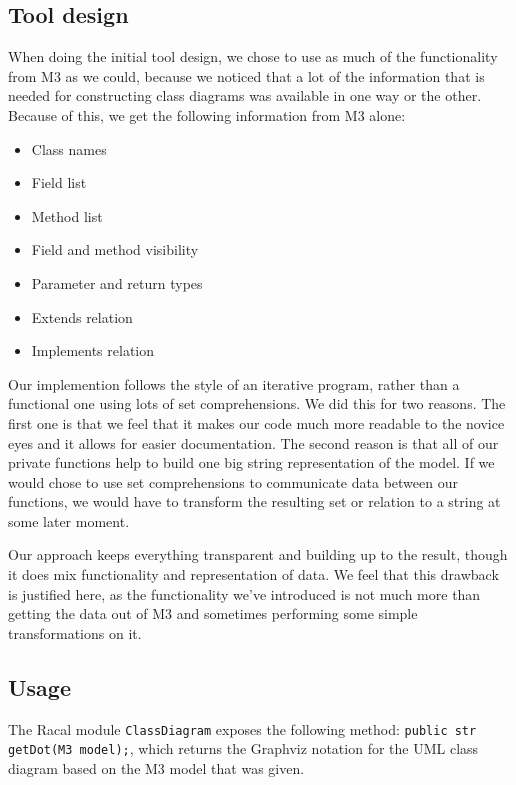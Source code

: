 \subsection{Tool design}
	When doing the initial tool design, we chose to use as much of the functionality from M3 as we could, because we noticed that a lot of the information that is needed for constructing class diagrams was available in one way or the other.
	Because of this, we get the following information from M3 alone:

	\begin{itemize}
		\item Class names
		\item Field list
		\item Method list
		\item Field and method visibility
		\item Parameter and return types
		\item Extends relation
		\item Implements relation
	\end{itemize}

	Our implemention follows the style of an iterative program, rather than a functional one using lots of set comprehensions.
	We did this for two reasons.
	The first one is that we feel that it makes our code much more readable to the novice eyes and it allows for easier documentation.
	The second reason is that all of our private functions help to build one big string representation of the model.
	If we would chose to use set comprehensions to communicate data between our functions, we would have to transform the resulting set or relation to a string at some later moment.

	Our approach keeps everything transparent and building up to the result, though it does mix functionality and representation of data.
	We feel that this drawback is justified here, as the functionality we've introduced is not much more than getting the data out of M3 and sometimes performing some simple transformations on it.

\subsection{Usage}
	The Racal module \texttt{ClassDiagram} exposes the following method: \texttt{public str getDot(M3 model);}, which returns the Graphviz notation for the UML class diagram based on the M3 model that was given.

